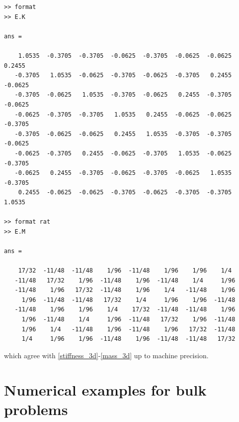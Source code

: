 \documentclass[a4paper]{article}
\begin{document}
\begin{lstlisting}
>> format
>> E.K

ans =

    1.0535  -0.3705  -0.3705  -0.0625  -0.3705  -0.0625  -0.0625   0.2455
   -0.3705   1.0535  -0.0625  -0.3705  -0.0625  -0.3705   0.2455  -0.0625
   -0.3705  -0.0625   1.0535  -0.3705  -0.0625   0.2455  -0.3705  -0.0625
   -0.0625  -0.3705  -0.3705   1.0535   0.2455  -0.0625  -0.0625  -0.3705
   -0.3705  -0.0625  -0.0625   0.2455   1.0535  -0.3705  -0.3705  -0.0625
   -0.0625  -0.3705   0.2455  -0.0625  -0.3705   1.0535  -0.0625  -0.3705
   -0.0625   0.2455  -0.3705  -0.0625  -0.3705  -0.0625   1.0535  -0.3705
    0.2455  -0.0625  -0.0625  -0.3705  -0.0625  -0.3705  -0.3705   1.0535
      
>> format rat
>> E.M

ans =

    17/32  -11/48  -11/48    1/96  -11/48    1/96    1/96    1/4
   -11/48   17/32    1/96  -11/48    1/96  -11/48    1/4     1/96
   -11/48    1/96   17/32  -11/48    1/96    1/4   -11/48    1/96    
     1/96  -11/48  -11/48   17/32    1/4     1/96    1/96  -11/48    
   -11/48    1/96    1/96    1/4    17/32  -11/48  -11/48    1/96    
     1/96  -11/48    1/4     1/96  -11/48   17/32    1/96  -11/48    
     1/96    1/4   -11/48    1/96  -11/48    1/96   17/32  -11/48    
     1/4     1/96    1/96  -11/48    1/96  -11/48  -11/48   17/32  
\end{lstlisting}

\noindent
which agree with \eqref{stiffness_3d}-\eqref{mass_3d} up to machine precision.


\section{Numerical examples for bulk problems}
\end{document}
